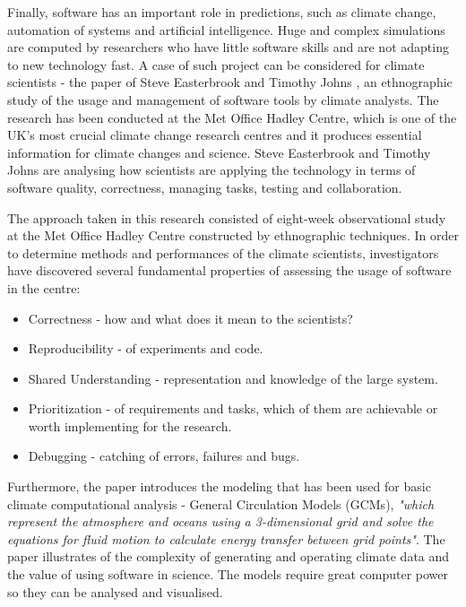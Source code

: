 Finally, software has an important role in predictions, such as climate change, automation of systems and artificial intelligence. \cite{easterbrook2009engineering}\cite{chasmSoftware} Huge and complex simulations are computed by researchers who have little software skills and are not adapting to new technology fast. A case of such project can be considered for climate scientists - the paper of Steve Easterbrook and Timothy Johns \cite{easterbrook2009engineering}, an ethnographic study of the usage and management of software tools by climate analysts. The research has been conducted at the Met Office Hadley Centre, which 
is one of the UK's most crucial climate change research centres and it produces essential information for climate changes and science. \cite{metOffice} Steve Easterbrook and Timothy Johns \cite{easterbrook2009engineering} are analysing how scientists are applying the technology in terms of software quality, correctness, managing tasks, testing and collaboration. 

The approach taken in this research consisted of eight-week observational study at the
Met Office Hadley Centre constructed by ethnographic techniques. In order to determine methods and performances of the climate scientists, investigators have discovered several fundamental properties of assessing the usage of software in the centre:\cite{easterbrook2009engineering}

\begin{itemize}
\item Correctness - how and what does it mean to the scientists? 
\item Reproducibility - of experiments and code. 
\item Shared Understanding - representation and knowledge of the large system. 
\item Prioritization - of requirements and tasks, which of them are achievable or worth implementing for the research. 
\item Debugging - catching of errors, failures and bugs.
\end{itemize}

Furthermore, the paper introduces the modeling that has been used for basic climate computational analysis - General Circulation Models (GCMs), \textit{"which represent the atmosphere and oceans using a 3-dimensional grid and solve the equations for fluid motion to calculate energy transfer between grid points"}. \cite{easterbrook2009engineering} The paper illustrates of the complexity of generating and operating climate data and the value of using software in science. The models require great computer power so they can be analysed and visualised.

